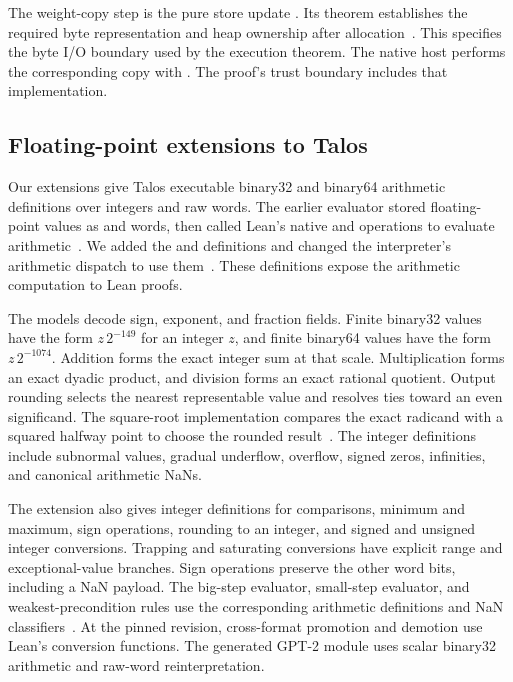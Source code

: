 The weight-copy step is the pure store update .  Its theorem establishes the required byte representation and heap ownership after allocation~\cite{input}.  This specifies the byte I/O boundary used by the execution theorem.  The native host performs the corresponding copy with .  The proof's trust boundary includes that implementation.

\subsection{Floating-point extensions to Talos}\label{sec:talosfp}

Our extensions give Talos executable binary32 and binary64 arithmetic definitions over integers and raw words.  The earlier evaluator stored floating-point values as  and  words, then called Lean's native  and  operations to evaluate arithmetic~\cite{talosbefore}.  We added the  and  definitions and changed the interpreter's arithmetic dispatch to use them~\cite{talosfp,talosdispatch}.  These definitions expose the arithmetic computation to Lean proofs.

The models decode sign, exponent, and fraction fields.  Finite binary32 values have the form $z\,2^{-149}$ for an integer $z$, and finite binary64 values have the form $z\,2^{-1074}$.  Addition forms the exact integer sum at that scale.  Multiplication forms an exact dyadic product, and division forms an exact rational quotient.  Output rounding selects the nearest representable value and resolves ties toward an even significand.  The square-root implementation compares the exact radicand with a squared halfway point to choose the rounded result~\cite{talosfp}.  The integer definitions include subnormal values, gradual underflow, overflow, signed zeros, infinities, and canonical arithmetic NaNs.

The extension also gives integer definitions for comparisons, minimum and maximum, sign operations, rounding to an integer, and signed and unsigned integer conversions.  Trapping and saturating conversions have explicit range and exceptional-value branches.  Sign operations preserve the other word bits, including a NaN payload.  The big-step evaluator, small-step evaluator, and weakest-precondition rules use the corresponding arithmetic definitions and NaN classifiers~\cite{talosdispatch,talosfpproofs}.  At the pinned revision, cross-format promotion and demotion use Lean's conversion functions.  The generated GPT-2 module uses scalar binary32 arithmetic and raw-word reinterpretation.

